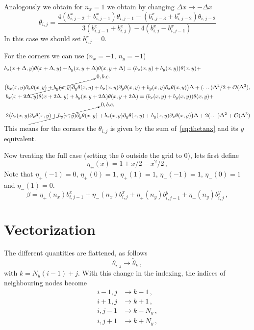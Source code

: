 \documentclass[notitlepage]{revtex4-2}
\begin{document}
{\color{red}Analogously we obtain for $n_x=1$ we obtain by changing $\Delta x \to - \Delta x$
\begin{equation}
    \theta_{i,j}=\frac{4(b^x_{i,j-2}+b^x_{i,j-1})\theta_{i,j-1}-(b^x_{i,j-3}+b^x_{i,j-2})\theta_{i,j-2}}{3(b^x_{i,j-1}+b^x_{i,j})-4(b^x_{i,j}-b^x_{i,j-1})}
\end{equation}
In this case we should set $b^x_{i,j}=0$.

For the corners we can use ($n_x=-1$, $n_y=-1$)
\begin{align}
    \begin{split}
    &b_x(x+\Delta, y)\theta(x+\Delta, y) + b_y(x, y + \Delta)\theta(x, y+ \Delta) = (b_x(x,y) + b_y(x,y))\theta(x,y) + \\
    &\big(b_x(x,y)\cancelto{0, b.c.}{\partial_x\theta(x,y) + b_y(x,y)\partial_y\theta(x,y)} + b_x(x,y)\partial_y\theta(x,y) + b_y(x,y)\partial_x\theta(x,y)\big)\Delta + (\dots)\Delta^2/2 + \mathcal{O}(\Delta^3),
    \end{split}\\
    \begin{split}
        &b_x(x+2\Delta, y)\theta(x+2\Delta, y) + b_y(x, y + 2\Delta)\theta(x, y+ 2\Delta) = (b_x(x,y) + b_y(x,y))\theta(x,y) + \\
        &2\big(b_x(x,y)\cancelto{0, b.c.}{\partial_x\theta(x,y) + b_y(x,y)\partial_y\theta(x,y)} + b_x(x,y)\partial_y\theta(x,y) + b_y(x,y)\partial_x\theta(x,y)\big)\Delta + 2(\dots)\Delta^2 + \mathcal{O}(\Delta^3)
        \end{split}
\end{align}
This means for the corners the $\theta_{i,j}$ is given by the sum of~\eqref{eq:thetanx} and its $y$ equivalent.}

Now treating the full case {\color{red}(setting the $b$ outside the grid to 0)}, lets first define 
\begin{equation}
\eta_{\pm}(x) = 1\pm x/2 -x^2/2\,,
\end{equation}
Note that $\eta_{+}(-1)=0$, $\eta_{+}(0)=1$, $\eta_{+}(1)=1$, $\eta_{-}(-1)=1$, $\eta_{-}(0)=1$ and $\eta_{-}(1)=0$.
\begin{equation}
\beta=\eta_{+}(n_x)b^x_{i,j-1}+\eta_{-}(n_x)b^x_{i,j}+\eta_{+}(n_y)b^y_{i,j-1}+\eta_{-}(n_y)b^y_{i,j}\,,
\end{equation}




\section{Vectorization}
The different quantities are flattened, as follows
\begin{equation}
\theta_{i,j} \rightarrow \tilde\theta_k\,,
\end{equation}
with $k = N_y(i-1)+j$. With this change in the indexing, the indices of neighbouring nodes become
\begin{align}
i-1,j &\rightarrow k-1\,,\\
i+1,j &\rightarrow k+1\,,\\
i,j-1 &\rightarrow k-N_y\,,\\
i,j+1 &\rightarrow k+N_y\,,
\end{align}
\end{document}
